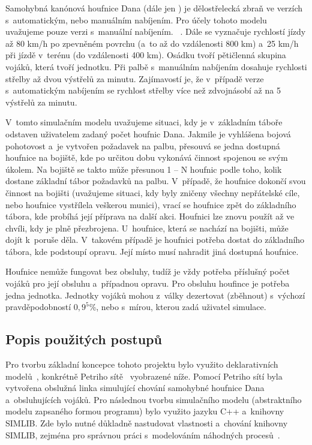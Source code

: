 \documentclass[a4paper]{article}
\begin{document}
        Samohybná kanónová houfnice Dana (dále jen ) je dělostřelecká zbraň ve verzích s automatickým, nebo manuálním nabíjením. Pro účely tohoto modelu uvažujeme pouze verzi s~manuální nabíjením.
        ~\cite{Houfnice}. 
        Dále se vyznačuje rychlostí jízdy až 80 km/h po zpevněném povrchu (a~to až do vzdálenosti 800 km) a~25 km/h při jízdě v terénu (do vzdálenosti 400 km). Osádku tvoří pětičlenná skupina vojáků, která tvoří jednotku.
        Při palbě s manuálním nabíjením dosahuje rychlosti střelby až dvou výstřelů za minutu. Zajímavostí je, že v případě verze s automatickým nabíjením se rychlost střelby více než zdvojnásobí až na 5 výstřelů za minutu.~\cite{Houfnice2} 

        V tomto simulačním modelu uvažujeme situaci, kdy je v základním táboře odstaven uživatelem zadaný počet houfnic Dana. Jakmile je vyhlášena bojová pohotovost a~je vytvořen požadavek na palbu, přesouvá se jedna dostupná houfnice na bojiště,
        kde po určitou dobu vykonává činnost spojenou se svým úkolem. Na bojiště se takto může přesunou 1 – N houfnic podle toho, kolik dostane základní tábor požadavků na palbu.
        V případě, že houfnice dokončí svou činnost na bojišti (uvažujeme situaci, kdy byly zničeny všechny nepřátelské cíle, nebo houfnice vystřílela veškerou munici), vrací se houfnice zpět do základního tábora, kde probíhá její příprava na další akci.
        Houfnici lze znovu použít až ve chvíli, kdy je plně přezbrojena. U~houfnice, která se nachází na bojišti, může dojít k poruše děla. V takovém případě je houfnici potřeba dostat do základního tábora, kde podstoupí opravu.
        Její místo musí nahradit jiná dostupná houfnice.  

        Houfnice nemůže fungovat bez obsluhy, tudíž je vždy potřeba příslušný počet vojáků pro její obsluhu a~případnou opravu. Pro obsluhu houfince je potřeba jedna jednotka.
        Jednotky vojáků mohou z války dezertovat (zběhnout) s výchozí pravděpodobností $0,9^5$\%, nebo s mírou, kterou zadá uživatel simulace.~\cite{Desertion}

        \subsection{Popis použitých postupů}
        \label{subsec:methods}

            Pro tvorbu základní koncepce tohoto projektu bylo využito deklarativních modelů~\cite[snímek 49]{IMS_slides}, konkrétně Petriho sítě~\cite[snímek 123]{IMS_slides} vyobrazené níže.
            Pomocí Petriho sítí byla vytvořena obslužná linka simulující chování samohybné houfnice Dana a~obsluhujících vojáků. Pro následnou tvorbu simulačního modelu (abstraktního modelu zapsaného formou programu) bylo využito jazyku C++ a~knihovny SIMLIB.
            Zde bylo nutné důkladně nastudovat vlastnosti a~chování knihovny SIMLIB, zejména pro správnou práci s modelováním náhodných procesů~\cite[snímek 72]{IMS_slides}. 
\end{document}
